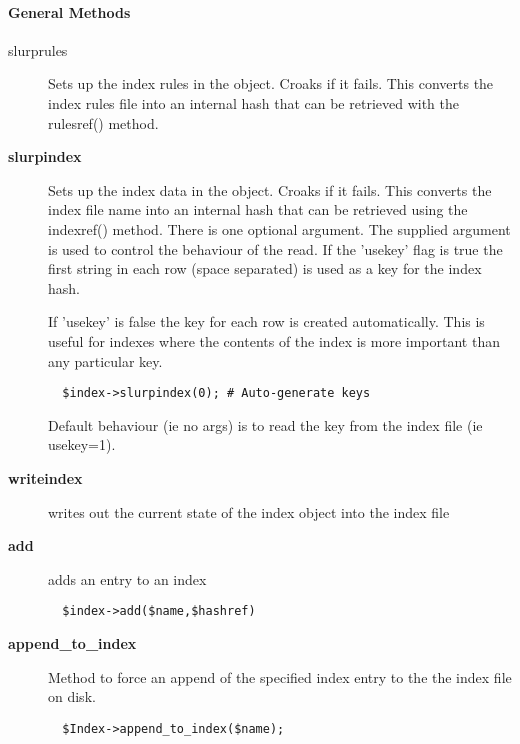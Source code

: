 \paragraph*{General Methods\label{ORAC::Index_General_Methods}}\begin{description}
\item[slurprules] \mbox{}

Sets up the index rules in the object. Croaks if it fails.
This converts the index rules file into an internal hash
that can be retrieved with the rulesref() method.

\item[\textbf{slurpindex}] \mbox{}

Sets up the index data in the object. Croaks if it fails.  This
converts the index file name into an internal hash that can be
retrieved using the indexref() method.  There is one optional
argument.  The supplied argument is used to control the behaviour of
the read. If the 'usekey' flag is true the first string in each row
(space separated) is used as a key for the index hash.



If 'usekey' is false the key for each row is created 
automatically. This is useful for indexes where the contents 
of the index is more important than any particular key.

\begin{verbatim}
  $index->slurpindex(0); # Auto-generate keys
\end{verbatim}


Default behaviour (ie no args) is to read the key from the
index file (ie usekey=1).

\item[\textbf{writeindex}] \mbox{}

writes out the current state of the index object into the index file

\item[\textbf{add}] \mbox{}

adds an entry to an index

\begin{verbatim}
  $index->add($name,$hashref)
\end{verbatim}
\item[\textbf{append\_to\_index}] \mbox{}

Method to force an append of the specified index entry to the
the index file on disk.

\begin{verbatim}
  $Index->append_to_index($name);
\end{verbatim}



\end{description}
